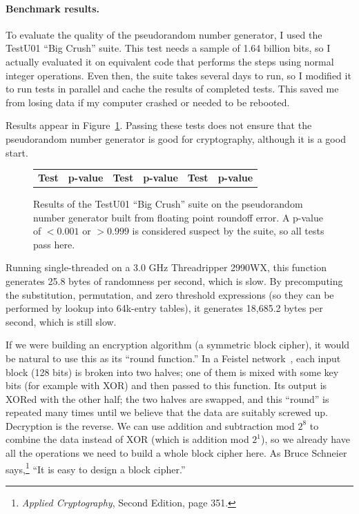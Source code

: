 \documentclass[twocolumn]{article}
\begin{document}
\paragraph{Benchmark results.}
To evaluate the quality of the pseudorandom number generator, I used
the TestU01 ``Big Crush'' suite. This test needs a sample of 1.64
billion bits, so I actually evaluated it on equivalent code that
performs the steps using normal integer operations. Even then, the
suite takes several days to run, so I modified it to run tests in
parallel and cache the results of completed tests. This saved me from
losing data if my computer crashed or needed to be rebooted.

Results appear in Figure~\ref{fig:testu01}. Passing these tests does
not ensure that the pseudorandom number generator is good for
cryptography, although it is a good start.

\begin{figure}[tp]
  \footnotesize
  \begin{tabular}{rl|rl|rl}
    {\bf Test} & {\bf p-value} &
    {\bf Test} & {\bf p-value} &
    {\bf Test} & {\bf p-value} \\
    
  \end{tabular}
  \caption{
    Results of the TestU01 ``Big Crush'' suite on the
    pseudorandom number generator built from floating point roundoff
    error. A p-value of $< 0.001$ or $> 0.999$ is considered
    suspect by the suite, so all tests pass here.
  } \label{fig:testu01}
\end{figure}

Running single-threaded on a 3.0 GHz Threadripper 2990WX, this
function generates 25.8 bytes of randomness per second, which is slow.
By precomputing the substitution, permutation, and zero threshold
expressions (so they can be performed by lookup into 64k-entry tables),
it generates 18,685.2 bytes per second, which is still slow.

If we were building an encryption algorithm (a symmetric block
cipher), it would be natural to use this as its ``round function.'' In
a Feistel network~\cite{feistel1973cryptography}, each input block
(128 bits) is broken into two halves; one of them is mixed with some
key bits (for example with XOR) and then passed to this function. Its
output is XORed with the other half; the two halves are swapped, and
this ``round'' is repeated many times until we believe that the data
are suitably screwed up. Decryption is the reverse. We can use
addition and subtraction mod $2^8$ to combine the data instead of XOR
(which is addition mod $2^1$), so we already have all the operations
we need to build a whole block cipher here. As Bruce Schneier
says,\footnote{{\it Applied Cryptography}, Second Edition, page 351.}
``It is easy to design a block cipher.''
\end{document}
